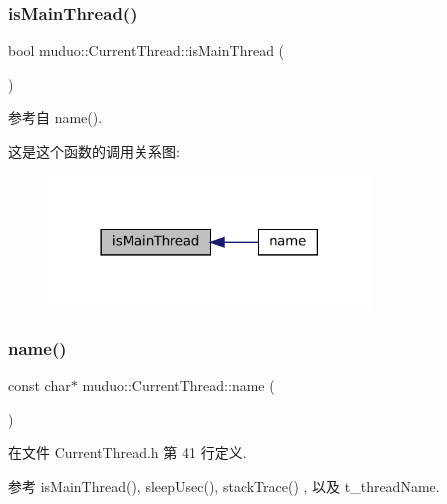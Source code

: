 \subsubsection{\texorpdfstring{is\+Main\+Thread()}{isMainThread()}}
{\footnotesize\ttfamily bool muduo\+::\+Current\+Thread\+::is\+Main\+Thread (\begin{DoxyParamCaption}{ }\end{DoxyParamCaption})}



参考自 name().

这是这个函数的调用关系图\+:
\nopagebreak
\begin{figure}[H]
\begin{center}
\leavevmode
\includegraphics[width=242pt]{namespacemuduo_1_1CurrentThread_ad8869cd6e09d4440fae5d6698558b3a5_icgraph}
\end{center}
\end{figure}
\mbox{\label{namespacemuduo_1_1CurrentThread_adc8b0cfe3a876d8edf272f982ea2c014}} 
\subsubsection{\texorpdfstring{name()}{name()}}
{\footnotesize\ttfamily const char$\ast$ muduo\+::\+Current\+Thread\+::name (\begin{DoxyParamCaption}{ }\end{DoxyParamCaption})\hspace{0.3cm}{\ttfamily [inline]}}



在文件 Current\+Thread.\+h 第 41 行定义.



参考 is\+Main\+Thread(), sleep\+Usec(), stack\+Trace() , 以及 t\+\_\+thread\+Name.

